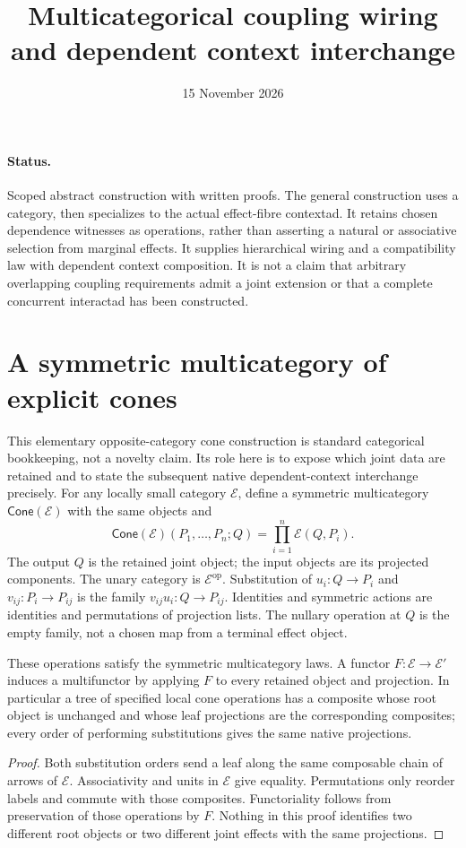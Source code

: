 \documentclass[11pt]{article}
\title{Multicategorical coupling wiring and dependent context interchange}
\date{15 November 2026}
\begin{document}
\maketitle
\paragraph{Status.} Scoped abstract construction with written proofs. The general construction uses a category, then specializes to the actual effect-fibre contextad. It retains chosen dependence witnesses as operations, rather than asserting a natural or associative selection from marginal effects. It supplies hierarchical wiring and a compatibility law with dependent context composition. It is not a claim that arbitrary overlapping coupling requirements admit a joint extension or that a complete concurrent interactad has been constructed.

\section{A symmetric multicategory of explicit cones}
This elementary opposite-category cone construction is standard categorical bookkeeping, not a novelty claim. Its role here is to expose which joint data are retained and to state the subsequent native dependent-context interchange precisely.
For any locally small category $\mathcal E$, define a symmetric multicategory $\mathsf{Cone}(\mathcal E)$ with the same objects and
\[
 \mathsf{Cone}(\mathcal E)(P_1,\ldots,P_n;Q)
   =\prod_{i=1}^n\mathcal E(Q,P_i).
\]
The output $Q$ is the retained joint object; the input objects are its projected components. The unary category is $\mathcal E^{\mathrm{op}}$. Substitution of $u_i:Q\to P_i$ and $v_{ij}:P_i\to P_{ij}$ is the family $v_{ij}u_i:Q\to P_{ij}$. Identities and symmetric actions are identities and permutations of projection lists. The nullary operation at $Q$ is the empty family, not a chosen map from a terminal effect object.

\begin{proposition}
These operations satisfy the symmetric multicategory laws. A functor $F:\mathcal E\to\mathcal E'$ induces a multifunctor by applying $F$ to every retained object and projection. In particular a tree of specified local cone operations has a composite whose root object is unchanged and whose leaf projections are the corresponding composites; every order of performing substitutions gives the same native projections.
\end{proposition}
\begin{proof}
Both substitution orders send a leaf along the same composable chain of arrows of $\mathcal E$. Associativity and units in $\mathcal E$ give equality. Permutations only reorder labels and commute with those composites. Functoriality follows from preservation of those operations by $F$. Nothing in this proof identifies two different root objects or two different joint effects with the same projections.
\end{proof}
\end{document}
